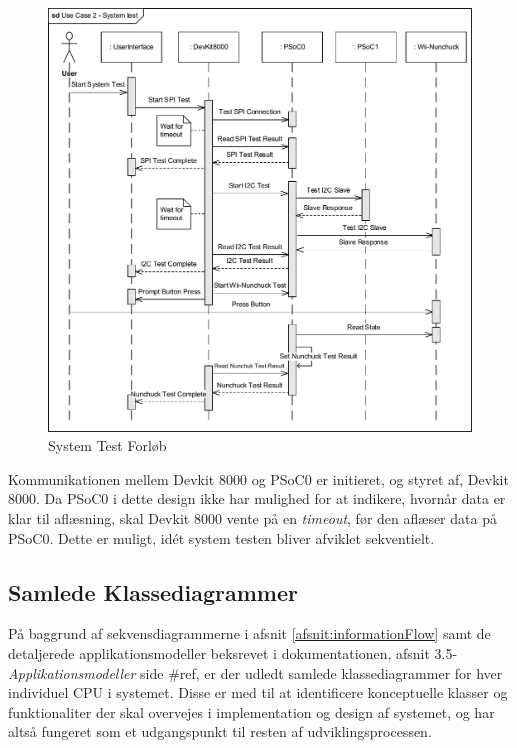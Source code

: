 \begin{figure}[H]
	\centering
	\includegraphics[width=\textwidth] {Systemarkitektur/images/SequenceDiagramUC2}
	\caption{System Test Forløb}
	\label{fig:SystemTestSekvensDiagram}
\end{figure}

\noindent Kommunikationen mellem Devkit 8000 og PSoC0 er initieret, og styret af, Devkit 8000. Da PSoC0 i dette design ikke har mulighed for at indikere, hvornår data er klar til aflæsning, skal Devkit 8000 vente på en \textit{timeout}, før den aflæser data på PSoC0. Dette er muligt, idét system testen bliver afviklet sekventielt.

\subsection{Samlede Klassediagrammer}
På baggrund af sekvensdiagrammerne i afsnit \ref{afsnit:informationFlow} samt de detaljerede applikationsmodeller beksrevet i dokumentationen, afsnit 3.5-\textit{Applikationsmodeller} side \#ref, er der udledt samlede klassediagrammer for hver individuel CPU i systemet. Disse er med til at identificere konceptuelle klasser og funktionaliter der skal overvejes i implementation og design af systemet, og har altså fungeret som et udgangspunkt til resten af udviklingsprocessen. \newline

